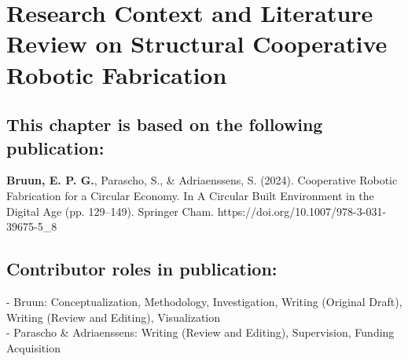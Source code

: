 
\graphicspath{{./\figurefolder/2ResearchContext/}}

\chapter{Research Context and Literature Review on Structural Cooperative Robotic Fabrication} \label{chap:2_context}

\thispagestyle{empty}

\vfill 
\section*{\normalsize\textmd{This chapter is based on the following publication:}}
    \vspace{-0.3cm}\noindent
    \textbf{Bruun, E. P. G.}, Parascho, S., \& Adriaenssens, S. (2024). Cooperative Robotic Fabrication for a Circular Economy. In A Circular Built Environment in the Digital Age (pp. 129–149). Springer Cham. https://doi.org/10.1007/978-3-031-39675-5\_8

\section*{\normalsize\textmd{Contributor roles in publication:}}
    \vspace{-0.3cm}\noindent
    - Bruun: Conceptualization, Methodology, Investigation, Writing (Original Draft), Writing (Review and Editing), Visualization\\
    - Parascho \& Adriaenssens: Writing (Review and Editing), Supervision, Funding Acquisition \\
    
\newpage

